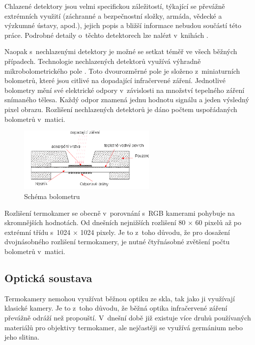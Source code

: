     Chlazené detektory jsou velmi specifickou záležitostí, týkající se převážně extrémních využití (záchranné a bezpečnostní složky, armáda, vědecké a výzkumné ústavy, apod.), jejich popis a bližší informace nebudou součástí této práce. Podrobné detaily o~těchto detektorech lze nalézt v~knihách \cite{daniels2010field, rogalski2010infrared}.
        
    Naopak s~nechlazenými detektory je možné se setkat téměř ve všech běžných případech. Technologie nechlazených detektorů využívá výhradně mikrobolometrického pole \cite{vojavcekco, jakl2011experimentalni}. Toto dvourozměrné pole je složeno z~miniaturních bolometrů, které jsou citlivé na dopadající infračervené záření. Jednotlivé bolometry mění své elektrické odpory v~závislosti na množství tepelného záření snímaného tělesa. Každý odpor znamená jednu hodnotu signálu a jeden výsledný pixel obrazu. Rozlišení nechlazených detektorů je dáno počtem uspořádaných bolometrů v~matici. 
    
    \begin{figure}[h]
      \centering
      \includegraphics[width=0.6\textwidth]{images/bolometer_scheme.png}
      \caption{Schéma bolometru \cite{vojavcekco}}
      \label{fig:bolometer_scheme}
	\end{figure}  
    
    Rozlišení termokamer se obecně v~porovnání s~RGB kamerami pohybuje na skromnějších hodnotách. Od dnešních nejnižších rozlišení 80 $\times$ 60 pixelů až po extrémní třídu s~1024 $\times$ 1024 pixely. Je to z~toho důvodu, že pro dosažení dvojnásobného rozlišení termokamery,  je nutné čtyřnásobné zvětšení počtu bolometrů v~matici.
    
	\subsection{Optická soustava}
     Termokamery nemohou využívat běžnou optiku ze skla, tak jako ji využívají klasické kamery. Je to z~toho důvodu, že běžná optika infračervené záření převážně odráží než propouští. V~dnešní době již existuje více druhů používaných materiálů pro objektivy termokamer, ale nejčastěji se využívá germánium nebo jeho slitina.  \cite{kadlecsovatermokamery,stupvnankova2009ir}
     
